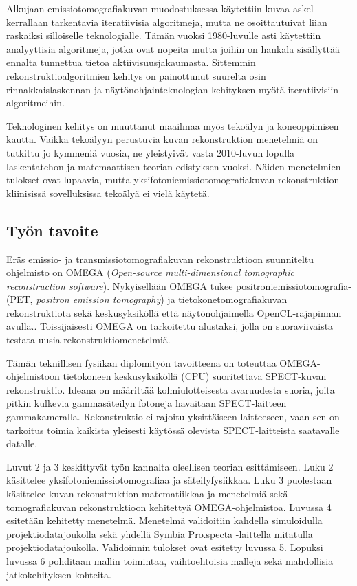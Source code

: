 Alkujaan emissiotomografiakuvan muodostuksessa käytettiin kuvaa askel kerrallaan tarkentavia iteratiivisia algoritmeja, mutta ne osoittautuivat liian raskaiksi silloiselle teknologialle. Tämän vuoksi 1980-luvulle asti käytettiin analyyttisia algoritmeja, jotka ovat nopeita mutta joihin on hankala sisällyttää ennalta tunnettua tietoa aktiivisuusjakaumasta. Sittemmin rekonstruktioalgoritmien kehitys on painottunut suurelta osin rinnakkaislaskennan ja näytönohjainteknologian kehityksen myötä iteratiivisiin algoritmeihin.\cite{bruyant_analytic_2002} 

Teknologinen kehitys on muuttanut maailmaa myös tekoälyn ja koneoppimisen kautta. Vaikka tekoälyyn perustuvia kuvan rekonstruktion menetelmiä on tutkittu jo kymmeniä vuosia, ne yleistyivät vasta 2010-luvun lopulla laskentatehon ja matemaattisen teorian edistyksen vuoksi. Näiden menetelmien tulokset ovat lupaavia, mutta yksifotoniemissiotomografiakuvan rekonstruktion kliinisissä sovelluksissa tekoälyä ei vielä käytetä.\cite{shao_artificial_2021}

\subsection{Työn tavoite}
Eräs emissio- ja transmissiotomografiakuvan rekonstruktioon suunniteltu ohjelmisto on OMEGA (\textit{Open-source multi-dimensional tomographic reconstruction software}). Nykyisellään OMEGA tukee positroniemissiotomografia- (PET, \textit{positron emission tomography}) ja tietokonetomografiakuvan rekonstruktiota sekä keskusyksiköllä että näytönohjaimella OpenCL-rajapinnan avulla.\cite{wettenhovi_omegaopen-source_2021}. Toissijaisesti OMEGA on tarkoitettu alustaksi, jolla on suoraviivaista testata uusia rekonstruktiomenetelmiä. 

Tämän teknillisen fysiikan diplomityön tavoitteena on toteuttaa OMEGA-ohjelmistoon tietokoneen keskusyksiköllä (CPU) suoritettava SPECT-kuvan rekonstruktio. Ideana on määrittää kolmiulotteisesta avaruudesta suoria, joita pitkin kulkevia gammasäteilyn fotoneja havaitaan SPECT-laitteen gammakameralla. Rekonstruktio ei rajoitu yksittäiseen laitteeseen, vaan sen on tarkoitus toimia kaikista yleisesti käytössä olevista SPECT-laitteista saatavalle datalle.

Luvut 2 ja 3 keskittyvät työn kannalta oleellisen teorian esittämiseen. Luku 2 käsittelee yksifotoniemissiotomografiaa ja säteilyfysiikkaa. Luku 3 puolestaan käsittelee kuvan rekonstruktion matematiikkaa ja menetelmiä sekä tomografiakuvan rekonstruktioon kehitettyä OMEGA-ohjelmistoa. Luvussa 4 esitetään kehitetty menetelmä. Menetelmä validoitiin kahdella simuloidulla projektiodatajoukolla sekä yhdellä Symbia Pro.specta -laittella mitatulla projektiodatajoukolla. Validoinnin tulokset ovat esitetty luvussa 5. Lopuksi luvussa 6 pohditaan mallin toimintaa, vaihtoehtoisia malleja sekä mahdollisia jatkokehityksen kohteita.